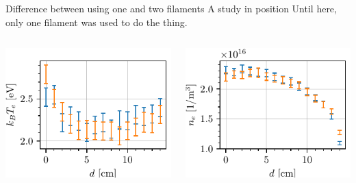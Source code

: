 \documentclass[10pt]{beamer}
\begin{document}
\begin{frame}{Difference between using one and two filaments}
    {A study in position}
    Until here, only one filament was used to do the thing.
    \begin{columns}
        \centering
        \includegraphics[scale=1]{../figures/temperatureeV_position_twofilaments.pdf}

        \centering
        \includegraphics[scale=1]{../figures/density_position_twofilaments.pdf}

    \end{columns}
\end{frame}
\end{document}
